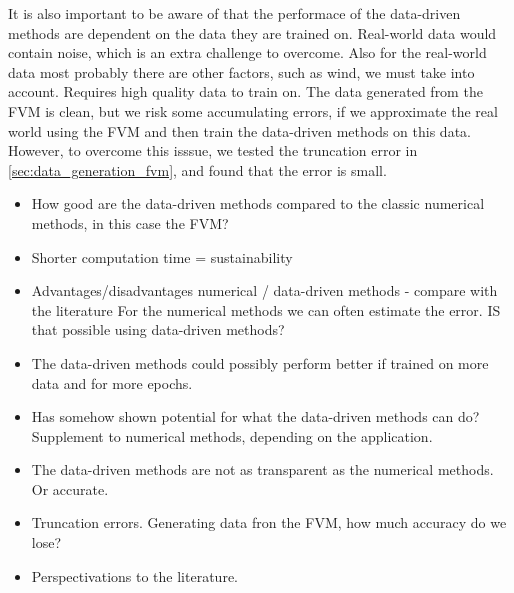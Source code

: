 It is also important to be aware of that the performace of the data-driven methods are dependent on the data they are trained on.
Real-world data would contain noise, which is an extra challenge to overcome.
Also for the real-world data most probably there are other factors, such as wind, we must take into account. 
Requires high quality data to train on. 
The data generated from the FVM is clean, but we risk some accumulating errors, if we approximate the real world using the FVM and then train the data-driven methods on this data.
However, to overcome this isssue, we tested the truncation error in \autoref{sec:data_generation_fvm}, and found that the error is small.







\begin{itemize}
    \item How good are the data-driven methods compared to the classic numerical methods, in this case the FVM?
    \item Shorter computation time = sustainability
    \item Advantages/disadvantages numerical / data-driven methods - compare with the literature 
    For the numerical methods we can often estimate the error. IS that possible using data-driven methods?
    \item The data-driven methods could possibly perform better if trained on more data and for more epochs.  
    \item Has somehow shown potential for what the data-driven methods can do? Supplement to numerical methods, depending on the application.
    \item The data-driven methods are not as transparent as the numerical methods. Or accurate.
    \item Truncation errors. Generating data fron the FVM, how much accuracy do we lose?
    \item Perspectivations to the literature.
\end{itemize}






